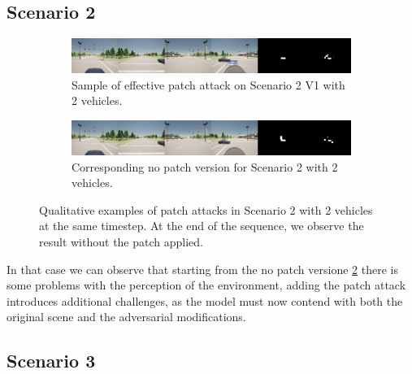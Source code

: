 \subsection{Scenario 2}
\begin{figure}[tph]
    \centering
    \begin{subfigure}[b]{1\textwidth}
        \centering
        \includegraphics[width=\textwidth]{figures/results/scenario2v12vh.jpg}
        \caption{Sample of effective patch attack on Scenario 2 V1 with 2 vehicles.}
        \label{fig:scenario2_2vh_v1}
    \end{subfigure}
    \vspace{0.5cm}
    \begin{subfigure}[b]{1\textwidth}
        \centering
        \includegraphics[width=\textwidth]{figures/results/scenario2gt2vh.jpg}
        \caption{Corresponding no patch version for Scenario 2 with 2 vehicles.}
        \label{fig:scenario2_2vh_nopatch}
    \end{subfigure}
    \caption{Qualitative examples of patch attacks in Scenario 2 with 2 vehicles at the same timestep.
        At the end of the sequence, we observe the result without the patch applied.}
    \label{fig:scenario2_2vh}
\end{figure}

In that case we can observe that starting from the no patch versione \ref{fig:scenario2_2vh_nopatch} there is some problems with the perception of the environment,
adding the patch attack introduces additional challenges, as the model must now contend with both the original scene and the adversarial modifications.

\subsection{Scenario 3}

